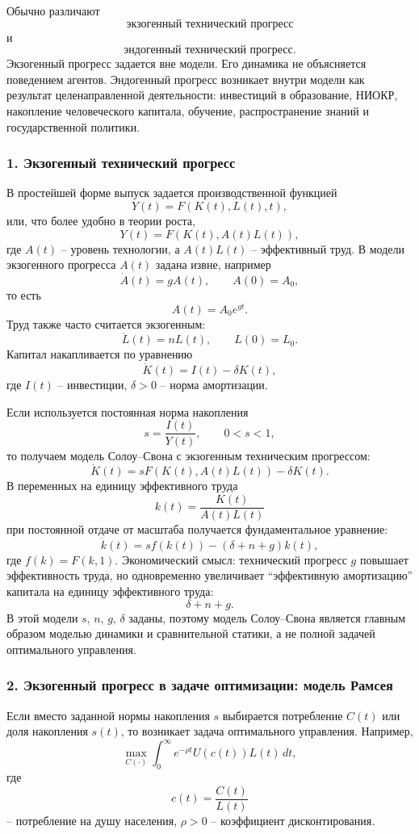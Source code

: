 \documentclass[12pt,a4paper]{article}
\begin{document}
Обычно различают
\[
\text{экзогенный технический прогресс}
\]
и
\[
\text{эндогенный технический прогресс}.
\]
Экзогенный прогресс задается вне модели. Его динамика не объясняется поведением агентов. Эндогенный прогресс возникает внутри модели как результат целенаправленной деятельности: инвестиций в образование, НИОКР, накопление человеческого капитала, обучение, распространение знаний и государственной политики.

\subsubsection*{1. Экзогенный технический прогресс}
В простейшей форме выпуск задается производственной функцией
\[
Y(t)=F(K(t),L(t),t),
\]
или, что более удобно в теории роста,
\[
Y(t)=F(K(t),A(t)L(t)),
\]
где $A(t)$ -- уровень технологии, а $A(t)L(t)$ -- эффективный труд. В модели экзогенного прогресса $A(t)$ задана извне, например
\[
\dot A(t)=gA(t), \qquad A(0)=A_0,
\]
то есть
\[
A(t)=A_0e^{gt}.
\]
Труд также часто считается экзогенным:
\[
\dot L(t)=nL(t), \qquad L(0)=L_0.
\]
Капитал накапливается по уравнению
\[
\dot K(t)=I(t)-\delta K(t),
\]
где $I(t)$ -- инвестиции, $\delta>0$ -- норма амортизации.

Если используется постоянная норма накопления
\[
s=\frac{I(t)}{Y(t)}, \qquad 0<s<1,
\]
то получаем модель Солоу--Свона с экзогенным техническим прогрессом:
\[
\dot K(t)=sF(K(t),A(t)L(t))-\delta K(t).
\]
В переменных на единицу эффективного труда
\[
k(t)=\frac{K(t)}{A(t)L(t)}
\]
при постоянной отдаче от масштаба получается фундаментальное уравнение:
\[
\dot k(t)=sf(k(t))-(\delta+n+g)k(t),
\]
где $f(k)=F(k,1)$. Экономический смысл: технический прогресс $g$ повышает эффективность труда, но одновременно увеличивает ``эффективную амортизацию'' капитала на единицу эффективного труда:
\[
\delta+n+g.
\]
В этой модели $s$, $n$, $g$, $\delta$ заданы, поэтому модель Солоу--Свона является главным образом моделью динамики и сравнительной статики, а не полной задачей оптимального управления.

\subsubsection*{2. Экзогенный прогресс в задаче оптимизации: модель Рамсея}
Если вместо заданной нормы накопления $s$ выбирается потребление $C(t)$ или доля накопления $s(t)$, то возникает задача оптимального управления. Например,
\[
\max_{C(\cdot)}\int_0^\infty e^{-\rho t}U(c(t))L(t)\,dt,
\]
где
\[
c(t)=\frac{C(t)}{L(t)}
\]
-- потребление на душу населения, $\rho>0$ -- коэффициент дисконтирования.
\end{document}
